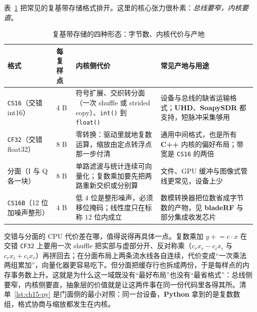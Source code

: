 \documentclass[12pt,a4paper,fontset=fandol]{ctexbook}
\newcommand{\Fn}[1]{\texttt{#1()}}
\newcommand{\Tp}[1]{\texttt{#1}}
\newcommand{\Lib}[1]{\textbf{#1}}
\newcommand{\Lang}[1]{\textsf{\bfseries #1}}
\newcommand{\CPP}{\Lang{C++}}
\newcommand{\PY}{\Lang{Python}}
\begin{document}
表~\ref{tab:ch15-format} 把常见的复基带存储格式排开。这里的核心张力很朴素：\emph{总线要窄，内核要直}。

\begin{table}[H]
\centering
\caption{复基带存储的四种形态：字节数、内核代价与产地}
\label{tab:ch15-format}
\small
\begin{tabular}{@{}>{\raggedright\arraybackslash}p{}
  >{\raggedright\arraybackslash}p{}
  >{\raggedright\arraybackslash}p{}
  >{\raggedright\arraybackslash}p{}@{}}
\toprule
格式 & 每复样点 & 内核侧代价 & 常见产地与用途 \\
\midrule
\Tp{CS16}（交错 int16） & $4$ B &
  符号扩展、交织转分面（一次 shuffle 或 strided copy）、\Fn{int} 到 \Fn{float} &
  设备与总线的缺省运输格式；\Lib{UHD}、\Lib{SoapySDR} 都支持，短脉冲采集够用 \\
\Tp{CF32}（交错 float32） & $8$ B &
  零转换：驱动里就地复数运算，缩放由定点转浮点那一步付清 &
  通用中间格式，也是所有 \CPP{} 内核的偏好布局；带宽是 \Tp{CS16} 的两倍 \\
分面（I 与 Q 各一块） & $8$ B &
  单路滤波与统计连续可向量化；复数乘加要先把两路重新交织或分别算 &
  文件、GPU 缓冲与图像式管线更常见，设备上少 \\
\Tp{CS16B}（12 位加噪声整形） & $4$ B &
  低 $4$ 位是整形噪声，必须移位掩码；线性度只在标称 $12$ 位内成立 &
  数模转换器把位数省成字节数的产物，见 \Lib{bladeRF} 与部分集成收发芯片 \\
\bottomrule
\end{tabular}
\end{table}

交错与分面的 CPU 代价差在哪，值得说得再具体一点。复数乘加 $y \mathrel{+}= c \cdot x$ 在交错 \Tp{CF32} 上要用一次 shuffle 把实部与虚部分开、反对称乘（$c_r x_r - c_i x_i$ 与 $c_r x_i + c_i x_r$）再拼回去；在分面布局上两条流水线各自连续，代价变成``一次乘法两组累加''，向量化器更容易吃下。但分面把缓存行也拆成两份，于是每样点的内存事务数上升。这就是为什么这一域既没有``最好布局''也没有``最省格式''：总线侧要窄，内核侧要直，抽象层的价值就是让这两件事在同一份代码里各得其所。清单~\ref{lst:ch15-py} 是门面侧的最小对照：同一台设备，\PY{} 拿到的是复数数组，格式协商与缩放都发生在内核。
\end{document}
